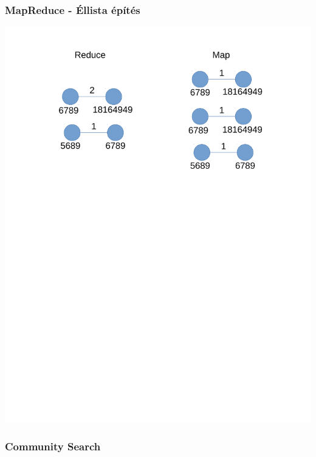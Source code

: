 \documentclass{beamer}
\begin{document}
\begin{frame}
\frametitle{MapReduce - Éllista építés}
\includegraphics[scale=0.6,trim = 2cm 12cm 3cm 0cm, clip]{figures/mapreduce.pdf}
\end{frame}

\begin{frame}
\frametitle{Community Search} 

\end{frame}
\end{document}
